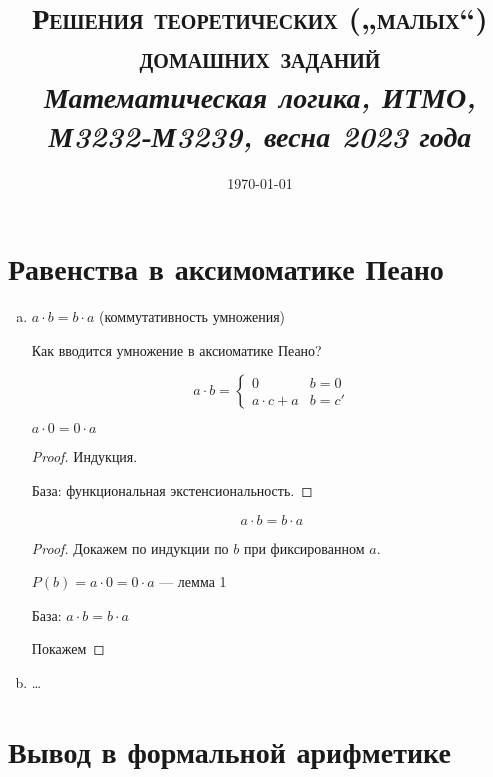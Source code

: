 \documentclass[12pt, a4paper]{article}
\title{{\Large\textsc{Решения \textbf{теоретических („малых“) домашних заданий}}}\\
\it Математическая логика, ИТМО, М3232-М3239, весна 2023 года}
\author{
  \vova
}
\date{\today}
\begin{document}
  \tittoc


\section{Равенства в аксимоматике Пеано}

   
\begin{enumerate}[(a)]
    \item $a \cdot b = b \cdot a$ (коммутативность умножения)
    
    Как вводится умножение в аксиоматике Пеано?

    \begin{equation}
        a \cdot b = \begin{cases}
            0 & b = 0 \\
            a \cdot c + a & b = c'
        \end{cases}
    \end{equation}


    \begin{lemma}
        $a \cdot 0 = 0 \cdot a$
    \end{lemma}
    \begin{proof}
        Индукция.

        База: функциональная экстенсиональность.
    \end{proof}

    \begin{theorem}
        \begin{equation}
            a \cdot b = b \cdot a
        \end{equation}
    \end{theorem}
    \begin{proof}
        Докажем по индукции по $b$ при фиксированном $a$.

        $P(b) = a \cdot 0 = 0 \cdot a$ — лемма 1

        База: $a \cdot b = b \cdot a$

        Покажем 
    \end{proof}

    \item …
\end{enumerate}

\setcounter{section}{3}

\newpage


\section{Вывод в формальной арифметике}
\end{document}

